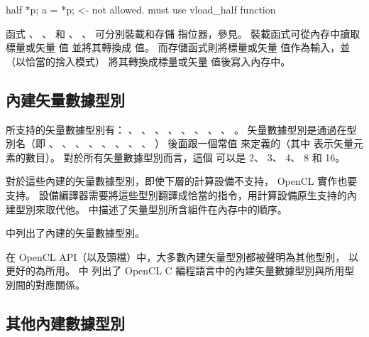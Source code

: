 half *p;
a = *p;		<- not allowed. must use vload_half function
\stopclc

函式 、 、 
和 、 、 
可分別裝載和存儲  指位器，參見。
裝載函式可從內存中讀取標量或矢量  值 並將其轉換成  值。
而存儲函式則將標量或矢量  值作為輸入，並（以恰當的捨入模式）
將其轉換成標量或矢量  值後寫入內存中。


\subsection[sec:bivdt]{內建矢量數據型別}

所支持的矢量數據型別有：
、 、
、 、
、 、
、 、
。
矢量數據型別是通過在型別名（即
、 、
、 、
、 、
、 、
）
後面跟一個常值  來定義的（其中  表示矢量元素的數目）。
對於所有矢量數據型別而言，這個  可以是 2、 3、 4、 8 和 16。

\startnotepar
對於這些內建的矢量數據型別，即使下層的計算設備不支持， OpenCL 實作也要支持。
設備編譯器需要將這些型別翻譯成恰當的指令，用計算設備原生支持的內建型別來取代他。
中描述了矢量型別所含組件在內存中的順序。
\stopnotepar

中列出了內建的矢量數據型別。

{}

在 OpenCL API（以及頭檔）中，大多數內建矢量型別都被聲明為其他型別，
以更好的為所用。
中
列出了 OpenCL C 編程語言中的內建矢量數據型別與所用型別間的對應關係。

{}

\subsection[sec:obidt]{其他內建數據型別}

